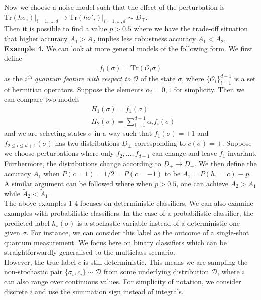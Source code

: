 \documentclass[onecolumn,prx, superscriptaddress,longbibliography,margin=1mm 11pt]{revtex4-2}
\begin{document}
Now we choose a noise model such that the effect of the perturbation is $\text{Tr}(h \sigma_i) \vert_{i=1,...,d} \rightarrow \text{Tr}(h \sigma'_i) \vert_{i=1,...,d} \sim D_{\mp}$. \\

Then it is possible to find a value $p>0.5$ where we have the trade-off situation that higher accuracy $A_1>A_2$ implies less robustness accuracy $\tilde{A}_1<\tilde{A}_2$.\\

\noindent \textbf{Example 4.}
    We can look at more general models of the following form. We first define 
    \begin{align}
        f_i(\sigma)=\text{Tr}(\mathcal{O}_i \sigma)
    \end{align}
as the $i^{\text{th}}$ \textit{quantum feature with respect to $\mathcal{O}$} of the state $\sigma$, where $\{\mathcal{O}_i\}_{i=1}^{d+1}$ is a set of hermitian operators. Suppose the elements $\alpha_i=0,1$ for simplicity. Then we can compare two models 
\begin{align}
    & H_1(\sigma)=f_1(\sigma) \nonumber \\
    & H_2 (\sigma)=\sum_{i=1}^{d+1} \alpha_i f_i(\sigma)
\end{align}
and we are selecting states $\sigma$ in a way such that $f_{1}(\sigma)=\pm 1$ and $f_{2\leq i \leq d+1}(\sigma)$ has two distributions $D_{\pm}$ corresponding to $c(\sigma)=\pm$. Suppose we choose perturbations where only $f_2,...,f_{d+1}$ can change and leave $f_1$ invariant. Furthermore, the distributions change according to $D_{\pm} \rightarrow D_{\mp}$. We then define the accuracy $A_1$ when $P(c=1)=1/2=P(c=-1)$ to be $A_1=P(h_1=c) \equiv p$. A similar argument can be followed where when $p>0.5$, one can achieve $A_2>A_1$ while $\tilde{A}_2<\tilde{A}_1$. \\

The above examples 1-4 focuses on deterministic classifiers. We can also examine examples with probabilistic classifiers. In the case of a probabilistic classifier, the predicted label $h_s(\sigma)$ is a stochastic variable instead of a deterministic one given $\sigma$. For instance, we can consider this label as the outcome of a single-shot quantum measurement. We focus here on binary classifiers which can be straightforwardly generalised to the multiclass scenario. \\

However, the true label $c$ is still deterministic. This means we are sampling the non-stochastic pair $\{\sigma_i, c_i\} \sim \mathcal{D}$ from some underlying distribution $\mathcal{D}$, where $i$ can also range over continuous values. For simplicity of notation, we consider discrete $i$ and use the summation sign instead of integrals. \\
\end{document}
